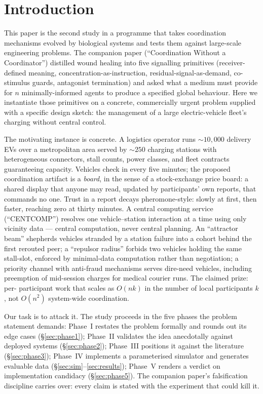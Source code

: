 \documentclass[twoside,twocolumn,usenatbib]{mnras}
\begin{document}
\section{Introduction}

\label{sec:intro}

This paper is the second study in a programme that takes coordination
mechanisms evolved by biological systems and tests them against
large-scale engineering problems.  The companion paper
(``Coordination Without a Coordinator'') distilled wound healing into
five signalling primitives (receiver-defined meaning,
concentration-as-instruction, residual-signal-as-demand, co-stimulus
guards, antagonist termination) and asked what a medium must provide
for $n$ minimally-informed agents to produce a specified global
behaviour.  Here we instantiate those primitives on a concrete,
commercially urgent problem supplied with a specific design sketch:
the management of a large electric-vehicle fleet's charging without
central control.

The motivating instance is concrete.  A logistics operator runs
$\sim\!10{,}000$ delivery EVs over a metropolitan area served by
$\sim\!250$ charging stations with heterogeneous connectors, stall
counts, power classes, and fleet contracts guaranteeing capacity.
Vehicles check in every five minutes; the proposed coordination
artifact is a \emph{board}, in the sense of a stock-exchange price
board: a shared display that anyone may read, updated by
participants' own reports, that commands no one.  Trust in a report
decays pheromone-style: slowly at first, then faster, reaching zero at
thirty minutes.  A central computing service (``CENTCOMP'') resolves
one vehicle--station interaction at a time using only vicinity data
--- central computation, never central planning.  An ``attractor
beam'' shepherds vehicles stranded by a station failure into a
cohort behind the first rerouted peer; a ``repulsor radius'' forbids
two vehicles holding the same stall-slot, enforced by minimal-data
computation rather than negotiation; a priority channel with anti-fraud
mechanisms serves dire-need vehicles, including preemption of
mid-session charges for medical courier runs.  The claimed prize: per-
participant work that scales as $O(nk)$ in the number of local
participants $k$, not $O(n^2)$ system-wide coordination.

Our task is to attack it.  The study
proceeds in the five phases the problem statement demands:
Phase~I restates the problem formally and rounds out its edge cases
(\S\ref{sec:phase1}); Phase~II validates the idea anecdotally against
deployed systems (\S\ref{sec:phase2}); Phase~III positions it against
the literature (\S\ref{sec:phase3}); Phase~IV implements a
parameterised simulator and generates evaluable data
(\S\ref{sec:sim}--\ref{sec:results}); Phase~V renders a verdict on
implementation candidacy (\S\ref{sec:phase5}).  The companion paper's
falsification discipline carries over: every claim is stated with the
experiment that could kill it.
\end{document}
